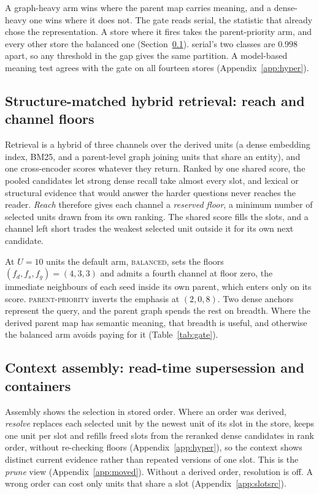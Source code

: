 \documentclass{article}
\newcommand{\serial}{\textsf{serial}}
\newcommand{\balanced}{\textsc{balanced}}
\newcommand{\parprio}{\textsc{parent-priority}}
\begin{document}
A graph-heavy arm wins where the parent map
carries meaning, and a dense-heavy one wins where it does not. The gate reads \serial{}, the statistic that
already chose the representation. A store where it fires takes the parent-priority arm, and every other store
the balanced one (Section~\ref{sec:read}). \serial{}'s two classes are $0.998$ apart, so any threshold in the gap gives the same partition. A model-based meaning test agrees with the gate on all fourteen stores (Appendix~\ref{app:hyper}).

\subsection{Structure-matched hybrid retrieval: reach and channel floors}\label{sec:read}

Retrieval is a hybrid of three channels over the derived units (a dense embedding index, BM25, and a parent-level graph joining
units that share an entity), and one cross-encoder scores whatever they
return. Ranked by one shared score, the pooled candidates
let strong dense recall take almost every slot, and lexical or structural evidence that would answer the
harder questions never reaches the reader. \emph{Reach} therefore gives each channel a \emph{reserved floor}, a minimum number of selected units drawn from its own ranking. The shared score fills the slots, and a channel left short trades the weakest selected unit outside it for its own next candidate.

At $U{=}10$ units the default arm, \balanced{}, sets the floors $(f_d,f_s,f_g)=(4,3,3)$ and admits a fourth channel at floor zero, the immediate neighbours of each seed inside its own parent, which enters only on its score. \parprio{} inverts the emphasis at $(2,0,8)$. Two dense anchors represent the query, and the parent graph spends the rest on breadth. Where the derived parent map has semantic meaning, that breadth is useful, and otherwise the balanced arm avoids paying for it (Table~\ref{tab:gate}).

\subsection{Context assembly: read-time supersession and containers}\label{sec:resolve}

Assembly shows the selection in stored order. Where an order was derived, \emph{resolve} replaces each selected unit by the newest unit of its slot in the store, keeps one unit per slot and refills freed slots from the reranked dense candidates in rank order, without re-checking floors (Appendix~\ref{app:hyper}), so the context shows distinct current evidence rather than repeated versions of one slot. This is the \emph{prune} view (Appendix~\ref{app:moved}). Without a derived order, resolution is off. A wrong order can cost only units that share a slot (Appendix~\ref{app:slotsrc}).
\end{document}
